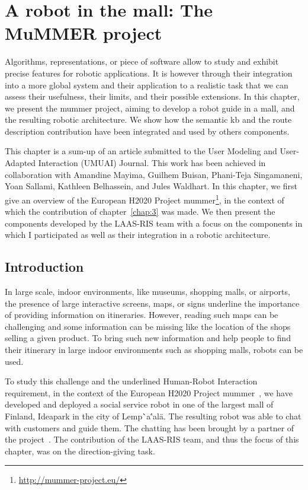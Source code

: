 \ifdefined{}
\else
\setcounter{chapter}{8} %
\dominitoc
\faketableofcontents
\fi

\chapter{A robot in the mall: The MuMMER project}
\minitoc
\label{chap:8}

Algorithms, representations, or piece of software allow to study and exhibit precise features for robotic applications. It is however through their integration into a more global system and their application to a realistic task that we can assess their usefulness, their limits, and their possible extensions. In this chapter, we present the \acrshort{mummer} project, aiming to develop a robot guide in a mall, and the resulting robotic architecture. We show how the semantic \acrfull{kb} and the route description contribution have been integrated and used by others components.

This chapter is a sum-up of an article submitted to the  User Modeling and User-Adapted Interaction (UMUAI) Journal. This work has been achieved in collaboration with Amandine Mayima, Guilhem Buisan, Phani-Teja Singamaneni, Yoan Sallami, Kathleen Belhassein, and Jules Waldhart. In this chapter, we first give an overview of the European H2020 Project \acrfull{mummer}\footnote{\url{http://mummer-project.eu/}}, in the context of which the contribution of chapter~\ref{chap:3} was made. We then present the components developed by the LAAS-RIS team with a focus on the components in which I participated as well as their integration in a robotic architecture.

\section{Introduction}

In large scale, indoor environments, like museums, shopping malls, or airports, the presence of large interactive screens, maps, or signs underline the importance of providing information on itineraries. However, reading such maps can be challenging and some information can be missing like the location of the shops selling a given product. To bring such new information and help people to find their itinerary in large indoor environments such as shopping malls, robots can be used.

To study this challenge and the underlined Human-Robot Interaction requirement, in the context of the European H2020 Project \acrshort{mummer}~\cite{foster_2016_mummer}, we have developed and deployed a social service robot in one of the largest mall of Finland, Ideapark in the city of Lemp\``a\''al\"a. The resulting robot was able to chat with customers and guide them. The chatting has been brought by a partner of the project~\cite{papaioannou_2018_human}. The contribution of the LAAS-RIS team, and thus the focus of this chapter, was on the direction-giving task.

